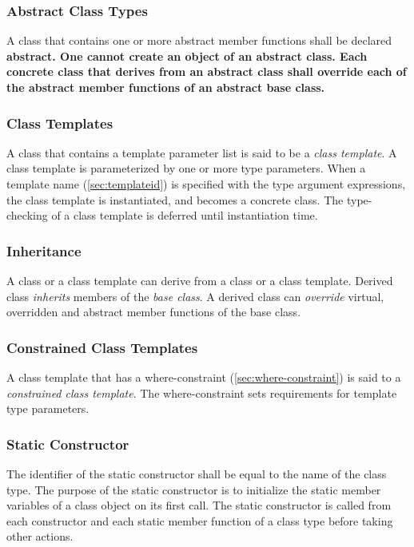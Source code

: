 \documentclass[a4paper,oneside,11pt]{article}
\begin{document}
\subsubsection{Abstract Class Types}

A class that contains one or more abstract member functions shall be declared \bf{abstract}.
One cannot create an object of an abstract class.
Each concrete class that derives from an abstract class shall override each of the
abstract member functions of an abstract base class.

\subsubsection{Class Templates}

A class that contains a template parameter list is said to be a \emph{class template}.
A class template is parameterized by one or more type parameters.
When a template name (\ref{sec:templateid}) is specified with the type argument expressions,
the class template is instantiated, and becomes a concrete class.
The type-checking of a class template is deferred until instantiation time.

\subsubsection{Inheritance}

A class or a class template can derive from a class or a class template.
Derived class \emph{inherits} members of the \emph{base class}.
A derived class can \emph{override} virtual, overridden and abstract member functions of the base class.

\subsubsection{Constrained Class Templates}

A class template that has a where-constraint (\ref{sec:where-constraint}) is said to a \emph{constrained class template}.
The where-constraint sets requirements for template type parameters.

\subsubsection{Static Constructor}

The identifier of the static constructor shall be equal to the name of the class type.
The purpose of the static constructor is to initialize the static member variables of a class object on its first call.
The static constructor is called from each constructor and each static member function of a class type
before taking other actions.
\end{document}
